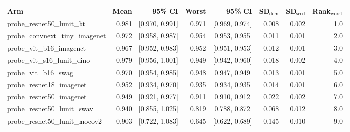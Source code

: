 \begin{tabular}{lrrrrrrr}
\toprule
Arm & Mean & 95\% CI & Worst & 95\% CI & SD$_\text{dom}$ & SD$_\text{seed}$ & Rank$_\text{worst}$ \\
\midrule
probe\_resnet50\_lunit\_bt & 0.981 & [0.970, 0.991] & 0.971 & [0.969, 0.974] & 0.008 & 0.002 & 1.0 \\
probe\_convnext\_tiny\_imagenet & 0.972 & [0.958, 0.987] & 0.954 & [0.953, 0.955] & 0.011 & 0.001 & 2.0 \\
probe\_vit\_b16\_imagenet & 0.967 & [0.952, 0.983] & 0.952 & [0.951, 0.953] & 0.012 & 0.001 & 3.0 \\
probe\_vit\_s16\_lunit\_dino & 0.979 & [0.956, 1.001] & 0.949 & [0.942, 0.960] & 0.018 & 0.002 & 4.0 \\
probe\_vit\_b16\_swag & 0.970 & [0.954, 0.985] & 0.948 & [0.947, 0.949] & 0.013 & 0.001 & 5.0 \\
probe\_resnet18\_imagenet & 0.952 & [0.934, 0.970] & 0.935 & [0.934, 0.935] & 0.014 & 0.001 & 6.0 \\
probe\_resnet50\_imagenet & 0.949 & [0.921, 0.977] & 0.911 & [0.910, 0.912] & 0.022 & 0.002 & 7.0 \\
probe\_resnet50\_lunit\_swav & 0.940 & [0.855, 1.025] & 0.819 & [0.788, 0.872] & 0.068 & 0.012 & 8.0 \\
probe\_resnet50\_lunit\_mocov2 & 0.903 & [0.722, 1.083] & 0.645 & [0.622, 0.689] & 0.145 & 0.010 & 9.0 \\
\bottomrule
\end{tabular}
